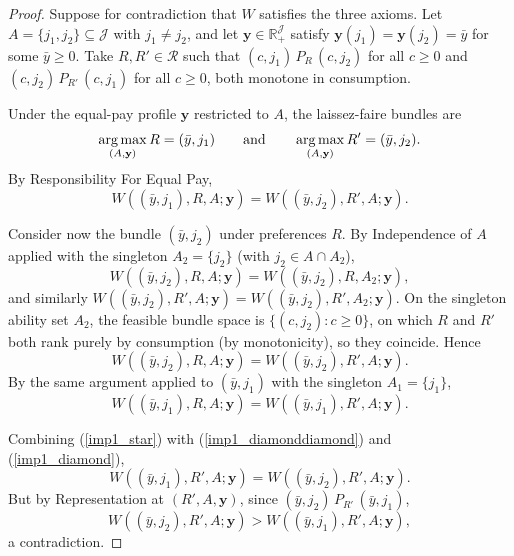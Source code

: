 \begin{proof}
Suppose for contradiction that $W$ satisfies the three axioms. Let
$A=\{j_1,j_2\}\subseteq\mathcal J$ with $j_1\neq j_2$, and let
$\mathbf y\in\mathbb R_+^{\mathcal J}$ satisfy $\mathbf y(j_1)=\mathbf
y(j_2)=\bar y$ for some $\bar y\geq 0$. Take $R,R'\in\mathcal R$ such that
$(c,j_1)\,P_R\,(c,j_2)$ for all $c\geq 0$ and $(c,j_2)\,P_{R'}\,(c,j_1)$ for all
$c\geq 0$, both monotone in consumption.

Under the equal-pay profile $\mathbf y$ restricted to $A$, the laissez-faire
bundles are
\begin{equation*}
\operatorname*{arg\,max}_{(A,\mathbf y)}R=(\bar y,j_1)
\qquad\text{and}\qquad
\operatorname*{arg\,max}_{(A,\mathbf y)}R'=(\bar y,j_2).
\end{equation*}
By Responsibility For Equal Pay,
\begin{equation}
W((\bar y,j_1),R,A;\mathbf y)=W((\bar y,j_2),R',A;\mathbf y). \label{imp1_star}
\end{equation}

Consider now the bundle $(\bar y,j_2)$ under preferences $R$. By Independence of
$A$ applied with the singleton $A_2=\{j_2\}$ (with $j_2\in A\cap A_2$),
\begin{equation*}
W((\bar y,j_2),R,A;\mathbf y)=W((\bar y,j_2),R,A_2;\mathbf y),
\end{equation*}
and similarly $W((\bar y,j_2),R',A;\mathbf y)=W((\bar y,j_2),R',A_2;\mathbf y)$.
On the singleton ability set $A_2$, the feasible bundle space is
$\{(c,j_2):c\geq 0\}$, on which $R$ and $R'$ both rank purely by consumption (by
monotonicity), so they coincide. Hence
\begin{equation}
W((\bar y,j_2),R,A;\mathbf y)=W((\bar y,j_2),R',A;\mathbf y). \label{imp1_diamond}
\end{equation}
By the same argument applied to $(\bar y,j_1)$ with the singleton
$A_1=\{j_1\}$,
\begin{equation}
W((\bar y,j_1),R,A;\mathbf y)=W((\bar y,j_1),R',A;\mathbf y).
\label{imp1_diamonddiamond}
\end{equation}

Combining (\ref{imp1_star}) with (\ref{imp1_diamonddiamond}) and
(\ref{imp1_diamond}),
\begin{equation*}
W((\bar y,j_1),R',A;\mathbf y)=W((\bar y,j_2),R',A;\mathbf y).
\end{equation*}
But by Representation at $(R',A,\mathbf y)$, since $(\bar y,j_2)\,P_{R'}\,(\bar
y,j_1)$,
\begin{equation*}
W((\bar y,j_2),R',A;\mathbf y)>W((\bar y,j_1),R',A;\mathbf y),
\end{equation*}
a contradiction.
\end{proof}

